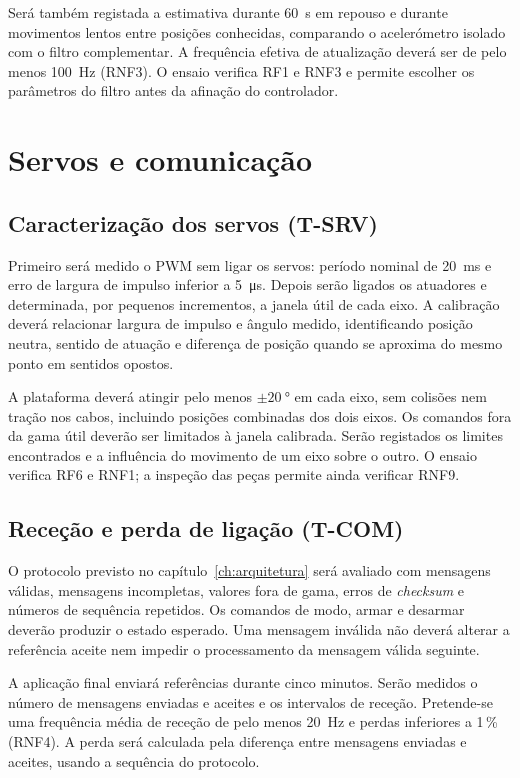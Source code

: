 Será também registada a estimativa durante \SI{60}{\second} em repouso e durante movimentos lentos entre posições conhecidas, comparando o acelerómetro isolado com o filtro complementar. A frequência efetiva de atualização deverá ser de pelo menos \SI{100}{\hertz} (RNF3). O ensaio verifica RF1 e RNF3 e permite escolher os parâmetros do filtro antes da afinação do controlador.

\section{Servos e comunicação}
\subsection{Caracterização dos servos (T-SRV)}
Primeiro será medido o PWM sem ligar os servos: período nominal de \SI{20}{\milli\second} e erro de largura de impulso inferior a \SI{5}{\micro\second}. Depois serão ligados os atuadores e determinada, por pequenos incrementos, a janela útil de cada eixo. A calibração deverá relacionar largura de impulso e ângulo medido, identificando posição neutra, sentido de atuação e diferença de posição quando se aproxima do mesmo ponto em sentidos opostos.

A plataforma deverá atingir pelo menos $\pm\SI{20}{\degree}$ em cada eixo, sem colisões nem tração nos cabos, incluindo posições combinadas dos dois eixos. Os comandos fora da gama útil deverão ser limitados à janela calibrada. Serão registados os limites encontrados e a influência do movimento de um eixo sobre o outro. O ensaio verifica RF6 e RNF1; a inspeção das peças permite ainda verificar RNF9.

\subsection{Receção e perda de ligação (T-COM)}
O protocolo previsto no capítulo~\ref{ch:arquitetura} será avaliado com mensagens válidas, mensagens incompletas, valores fora de gama, erros de \textit{checksum} e números de sequência repetidos. Os comandos de modo, armar e desarmar deverão produzir o estado esperado. Uma mensagem inválida não deverá alterar a referência aceite nem impedir o processamento da mensagem válida seguinte.

A aplicação final enviará referências durante cinco minutos. Serão medidos o número de mensagens enviadas e aceites e os intervalos de receção. Pretende-se uma frequência média de receção de pelo menos \SI{20}{\hertz} e perdas inferiores a 1\,\% (RNF4). A perda será calculada pela diferença entre mensagens enviadas e aceites, usando a sequência do protocolo.

